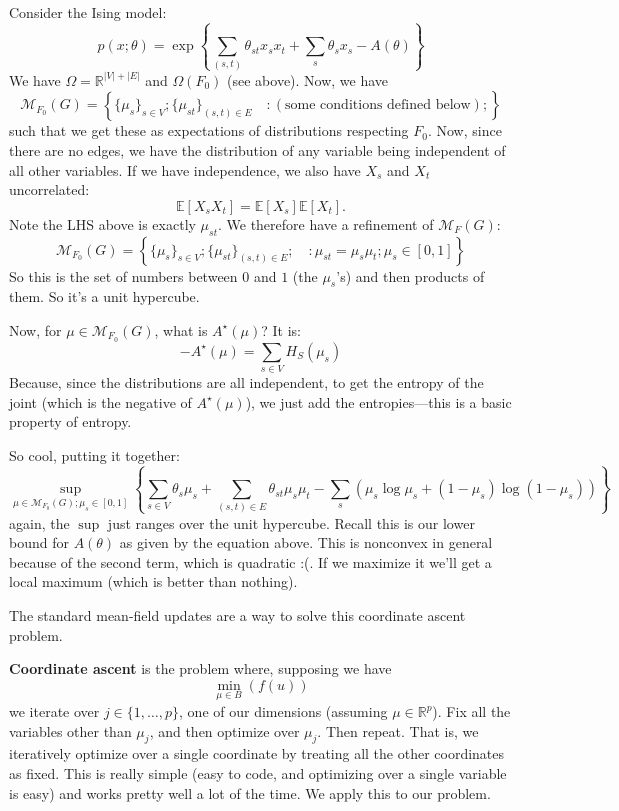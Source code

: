 \documentclass{article}
\newcommand{\E}{\mathbb{E}}
\newcommand{\M}{\mathcal{M}}
\newcommand{\R}{\mathbb{R}}
\begin{document}
Consider the Ising model:
$$
p(x;\theta) = 
\exp
\left\{
\sum_{(s,t)}
\theta_{st}x_sx_t
+
\sum_{s}
\theta_s x_s
- A(\theta)
\right\}
$$
We have $\Omega = \R^{|V| + |E|}$ and $\Omega(F_0)$ (see above).
Now, we have
$$
\M_{F_0}(G) = 
\left\{
\{\mu_s\}_{s \in V};
\{\mu_{st}\}_{(s,t) \in E}
\quad:
(\textrm{some conditions defined below});
\right\}
$$
such that we get these as expectations of distributions respecting $F_0$.
Now, since there are no edges, we have the distribution of any variable being independent of all other variables.
If we have independence, we also have $X_s$ and $X_t$ uncorrelated:
$$
\E[X_s X_t] = 
\E[X_s]
\E[X_t].
$$
Note the LHS above is exactly $\mu_{st}$.
We therefore have a refinement of $\M_F(G)$:
$$
\M_{F_0}(G) = 
\left\{
\{\mu_s\}_{s \in V};
\{\mu_{st}\}_{(s,t) \in E};
\quad:
\mu_{st} = \mu_s\mu_t; \mu_s \in [0,1]
\right\}
$$
So this is the set of numbers between $0$ and $1$ (the $\mu_s$'s) and then products of them.
So it's a unit hypercube.

Now, for $\mu \in \M_{F_0}(G)$, what is $A^\star(\mu)$?
It is:
$$
-A^\star(\mu)
=
\sum_{s\in V}
H_S (\mu_s)
$$
Because, 
since the distributions are all independent, to get the entropy of the joint (which is the negative of $A^\star(\mu)$), we just add the entropies---this is a basic property of entropy.

So cool, putting it together:
\begin{equation}
\sup_{\mu\in \M_{F_0}(G) ; \mu_s\in [0,1]}
\left\{
\sum_{s\in V}
\theta_s\mu_s
+ \sum_{(s,t)\in E} \theta_{st} \mu_s \mu_t
-
\sum_s
\left(
\mu_s \log \mu_s
+
(1 - \mu_s)
\log(1 - \mu_s)
\right)
\right\}
\label{meanfieldeq1}
\end{equation}
again, the $\sup$ just ranges over the unit hypercube.
Recall this is our lower bound for $A(\theta)$ as given by the equation above.
This is nonconvex in general because of the second term, which is quadratic :(.
If we maximize it we'll get a local maximum (which is better than nothing).

The standard mean-field updates are a way to solve this coordinate ascent problem.

\textbf{Coordinate ascent} is the problem where, supposing we have
$$
\min_{\mu\in B} (f(u))
$$
we iterate over $j\in \{1,\ldots,p\}$, one of our dimensions (assuming $\mu \in \R^p$).
Fix all the variables other than $\mu_j$, and then optimize over $\mu_j$.
Then repeat.
That is, we iteratively optimize over a single coordinate by treating all the other coordinates as fixed.
This is really simple (easy to code, and optimizing over a single variable is easy) and works pretty well a lot of the time.
We apply this to our problem.
\end{document}
